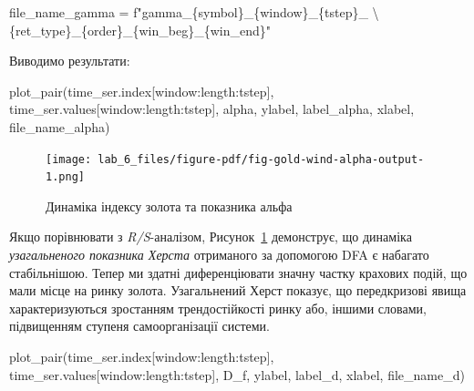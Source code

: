 \documentclass[
  letterpaper,
]{report}
\newenvironment{Shaded}{\begin{snugshade}}{\end{snugshade}}
\newcommand{\CharTok}[1]{\textcolor[rgb]{0.13,0.47,0.30}{#1}}
\newcommand{\NormalTok}[1]{\textcolor[rgb]{0.00,0.23,0.31}{#1}}
\newcommand{\OperatorTok}[1]{\textcolor[rgb]{0.37,0.37,0.37}{#1}}
\newcommand{\SpecialCharTok}[1]{\textcolor[rgb]{0.37,0.37,0.37}{#1}}
\newcommand{\SpecialStringTok}[1]{\textcolor[rgb]{0.13,0.47,0.30}{#1}}
\begin{document}
\begin{Shaded}
\begin{Highlighting}[]
\NormalTok{file\_name\_gamma }\OperatorTok{=} \SpecialStringTok{f"gamma\_}\SpecialCharTok{\{}\NormalTok{symbol}\SpecialCharTok{\}}\SpecialStringTok{\_}\SpecialCharTok{\{}\NormalTok{window}\SpecialCharTok{\}}\SpecialStringTok{\_}\SpecialCharTok{\{}\NormalTok{tstep}\SpecialCharTok{\}}\SpecialStringTok{\_ }\CharTok{\textbackslash{}}
\SpecialStringTok{            }\SpecialCharTok{\{}\NormalTok{ret\_type}\SpecialCharTok{\}}\SpecialStringTok{\_}\SpecialCharTok{\{}\NormalTok{order}\SpecialCharTok{\}}\SpecialStringTok{\_}\SpecialCharTok{\{}\NormalTok{win\_beg}\SpecialCharTok{\}}\SpecialStringTok{\_}\SpecialCharTok{\{}\NormalTok{win\_end}\SpecialCharTok{\}}\SpecialStringTok{"}
\end{Highlighting}
\end{Shaded}

Виводимо результати:

\begin{Shaded}
\begin{Highlighting}[]
\NormalTok{plot\_pair(time\_ser.index[window:length:tstep],}
\NormalTok{          time\_ser.values[window:length:tstep],}
\NormalTok{          alpha, }
\NormalTok{          ylabel, }
\NormalTok{          label\_alpha,}
\NormalTok{          xlabel,}
\NormalTok{          file\_name\_alpha)}
\end{Highlighting}
\end{Shaded}

\begin{figure}[H]

{\centering \texttt{[image: lab\_6\_files/figure-pdf/fig-gold-wind-alpha-output-1.png]}

}

\caption{\label{fig-gold-wind-alpha}Динаміка індексу золота та показника
альфа}

\end{figure}

Якщо порівнювати з \emph{R/S}-аналізом,
Рисунок~\ref{fig-gold-wind-alpha} демонструє, що динаміка
\emph{узагальненого показника Херста} отриманого за допомогою DFA є
набагато стабільнішою. Тепер ми здатні диференціювати значну частку
крахових подій, що мали місце на ринку золота. Узагальнений Херст
показує, що передкризові явища характеризуються зростанням
трендостійкості ринку або, іншими словами, підвищенням ступеня
самоорганізації системи.

\begin{Shaded}
\begin{Highlighting}[]
\NormalTok{plot\_pair(time\_ser.index[window:length:tstep],}
\NormalTok{          time\_ser.values[window:length:tstep],}
\NormalTok{          D\_f, }
\NormalTok{          ylabel, }
\NormalTok{          label\_d,}
\NormalTok{          xlabel,}
\NormalTok{          file\_name\_d)}
\end{Highlighting}
\end{Shaded}
\end{document}
